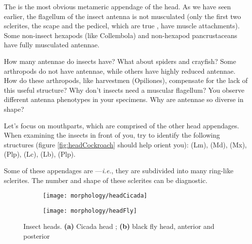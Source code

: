 \noindent{}The  is the most obvious metameric appendage of the head. As we have seen earlier, the flagellum of the insect antenna is not musculated (only the first two sclerites, the scape and the pedicel, which are true , have muscle attachments). Some non-insect hexapods (like Collembola) and non-hexapod pancrustaceans have fully musculated antennae.\vspace{3mm}

\begin{theo}
{}How many antennae do insects have? What about spiders and crayfish? Some arthropods do not have antennae, while others have highly reduced antennae. How do these arthropods, like harvestmen (Opiliones), compensate for the lack of this useful structure? Why don't insects need a muscular flagellum? You observe different antenna phenotypes in your specimens. Why are antennae so diverse in shape?
\end{theo}

\noindent{}Let's focus on mouthparts, which are comprised of the other head appendages. When examining the insects in front of you, try to identify the following structures (figure \ref{fig:headCockroach} should help orient you):  (Lm),  (Md),  (Mx),  (Plp),  (Lc),  (Lb),  (Plp).\vspace{3mm}


\noindent{}Some of these appendages are ---\textit{i.e.}, they are subdivided into many ring-like sclerites. The number and shape of these sclerites can be diagnostic. \vspace{3mm}

\begin{figure}[ht!]
    \centering
    \begin{subfigure}[ht!]{0.3\textwidth}
        \texttt{[image: morphology/headCicada]}
        \caption{}
        \label{fig:cicadaHead}
    \end{subfigure}
    \qquad
    \begin{subfigure}[ht!]{0.6\textwidth}
        \texttt{[image: morphology/headFly]}
        \caption{}
        \label{fig:headFly}
    \end{subfigure}
    \caption{Insect heads. \textbf{(a)} Cicada head \citep[redrawn from ][Fig. 121]{bhl128276}; \textbf{(b)} black fly head, anterior and posterior \citep[redrawn from][Fig. 24A,B]{snodgrass1944feeding}}
\end{figure}

